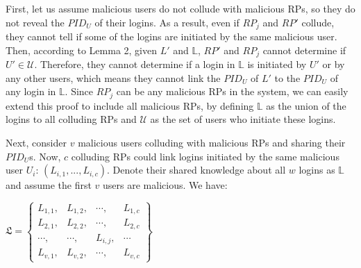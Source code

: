 First, let us assume malicious users do not collude with malicious RPs, so they do not reveal the $PID_U$ of their logins. As a result, even if $RP_j$ and $RP'$ collude, they cannot tell if some of the logins are initiated by the same malicious user. Then, according to Lemma 2, given $L'$ and $\mathbb{L}$, $RP'$ and $RP_j$ cannot determine if $U' \in \mathcal{U}$. Therefore, they cannot determine if a login in $\mathbb{L}$ is initiated by $U'$ or by any other users, which means they cannot link the $PID_U$ of $L'$ to the $PID_U$ of any login in $\mathbb{L}$. Since $RP_j$ can be any malicious RPs in the system, we can easily extend this proof to include all malicious RPs, by defining $\mathbb{L}$ as the union of the logins to all colluding RPs and $\mathcal{U}$ as the set of users who initiate these logins.






Next, consider $v$ malicious users colluding with malicious RPs and sharing their $PID_U$s. Now, $c$ colluding RPs could link logins initiated by the same malicious user $U_i$: $(L_{i,1},..., L_{i,c})$. Denote their shared knowledge about all $w$ logins as $\mathbb{L}$ and assume the first $v$ users are malicious. We have:

{\centering $\mathfrak{L}=\left \{ \begin{matrix} L_{1,1},&L_{1,2},&\cdots,&L_{1,c} \\
L_{2,1},& L_{2,2},&\cdots,&L_{2,c}  \\
\cdots,&\cdots,&L_{i,j},&\cdots  \\
L_{v,1},&L_{v,2},&\cdots,&L_{v,c}
\end{matrix}\right\}$
\par}

